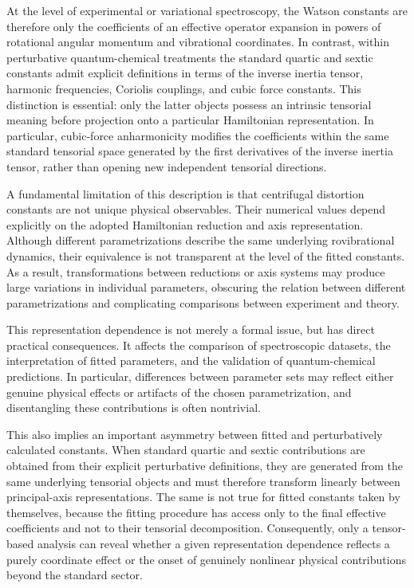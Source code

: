 \documentclass[aip,jcp,reprint,floatfix]{revtex4-2}
\begin{document}
At the level of experimental or variational spectroscopy, the Watson
constants are therefore only the coefficients of an effective operator
expansion in powers of rotational angular momentum and vibrational
coordinates. In contrast, within perturbative quantum-chemical
treatments the standard quartic and sextic constants admit explicit
definitions in terms of the inverse inertia tensor, harmonic
frequencies, Coriolis couplings, and cubic force constants. This
distinction is essential: only the latter objects possess an intrinsic
tensorial meaning before projection onto a particular Hamiltonian
representation. In particular, cubic-force anharmonicity modifies the
coefficients within the same standard tensorial space generated by the
first derivatives of the inverse inertia tensor, rather than opening
new independent tensorial directions.

A fundamental limitation of this description is that centrifugal
distortion constants are not unique physical observables. Their
numerical values depend explicitly on the adopted Hamiltonian
reduction and axis representation. Although different parametrizations
describe the same underlying rovibrational dynamics, their equivalence
is not transparent at the level of the fitted constants. As a result,
transformations between reductions or axis systems may produce large
variations in individual parameters, obscuring the relation between
different parametrizations and complicating comparisons between
experiment and theory.

This representation dependence is not merely a formal issue, but has
direct practical consequences. It affects the comparison of
spectroscopic datasets, the interpretation of fitted parameters, and
the validation of quantum-chemical predictions. In particular,
differences between parameter sets may reflect either genuine physical
effects or artifacts of the chosen parametrization, and disentangling
these contributions is often nontrivial.

This also implies an important asymmetry between fitted and
perturbatively calculated constants. When standard quartic and sextic
contributions are obtained from their explicit perturbative
definitions, they are generated from the same underlying tensorial
objects and must therefore transform linearly between principal-axis
representations. The same is not true for fitted constants taken by
themselves, because the fitting procedure has access only to the final
effective coefficients and not to their tensorial decomposition.
Consequently, only a tensor-based analysis can reveal whether a given
representation dependence reflects a purely coordinate effect or the
onset of genuinely nonlinear physical contributions beyond the
standard sector.
\end{document}
